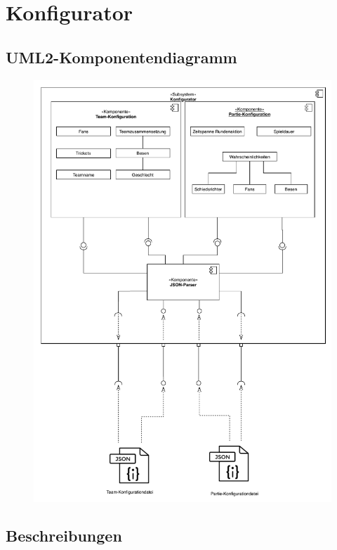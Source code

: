 \section{Konfigurator}

	\subsection{UML2-Komponentendiagramm}
		
		
		\begin{figure}[H]
    		\centering
    		 \includegraphics[scale=0.6]{images/Leveleditor.pdf}
		\end{figure}

	\subsection{Beschreibungen}

